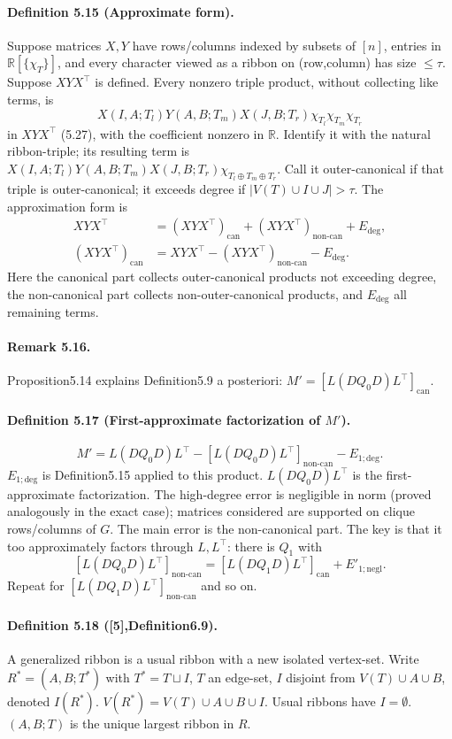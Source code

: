 \documentclass[10pt,a4paper]{article}
\begin{document}
\paragraph{Definition 5.15 (Approximate form).} Suppose matrices $X,Y$ have rows/columns indexed by subsets of $[n]$, entries in $\mathbb R[\{\chi_T\}]$, and every character viewed as a ribbon on (row,column) has size $\le\tau$. Suppose $XYX^\top$ is defined. Every nonzero triple product, without collecting like terms, is
\[X(I,A;T_l)Y(A,B;T_m)X(J,B;T_r)\chi_{T_l}\chi_{T_m}\chi_{T_r}\tag{5.28}\]
in $XYX^\top$ (5.27), with the coefficient nonzero in $\mathbb R$. Identify it with the natural ribbon-triple; its resulting term is $X(I,A;T_l)Y(A,B;T_m)X(J,B;T_r)\chi_{T_l\oplus T_m\oplus T_r}$. Call it outer-canonical if that triple is outer-canonical; it exceeds degree if $|V(T)\cup I\cup J|>\tau$. The approximation form is
\begin{align*}XYX^\top&=(XYX^\top)_{\mathrm{can}}+(XYX^\top)_{\mathrm{non\text{-}can}}+E_{\mathrm{deg}},\\(XYX^\top)_{\mathrm{can}}&=XYX^\top-(XYX^\top)_{\mathrm{non\text{-}can}}-E_{\mathrm{deg}}.\tag{5.29}\end{align*}
Here the canonical part collects outer-canonical products not exceeding degree, the non-canonical part collects non-outer-canonical products, and $E_{\mathrm{deg}}$ all remaining terms.
\paragraph{Remark 5.16.} Proposition5.14 explains Definition5.9 a posteriori: $M'=[L(DQ_0D)L^\top]_{\mathrm{can}}$.
\paragraph{Definition 5.17 (First-approximate factorization of $M'$).}
\[M'=L(DQ_0D)L^\top-[L(DQ_0D)L^\top]_{\mathrm{non\text{-}can}}-E_{1;\mathrm{deg}}.\tag{5.30}\]
$E_{1;\mathrm{deg}}$ is Definition5.15 applied to this product. $L(DQ_0D)L^\top$ is the first-approximate factorization. The high-degree error is negligible in norm (proved analogously in the exact case); matrices considered are supported on clique rows/columns of $G$. The main error is the non-canonical part. The key is that it too approximately factors through $L,L^\top$: there is $Q_1$ with
\[[L(DQ_0D)L^\top]_{\mathrm{non\text{-}can}}=[L(DQ_1D)L^\top]_{\mathrm{can}}+E'_{1;\mathrm{negl}}.\tag{5.31}\]
Repeat for $[L(DQ_1D)L^\top]_{\mathrm{non\text{-}can}}$ and so on.
\paragraph{Definition 5.18 ([5],Definition6.9).} A generalized ribbon is a usual ribbon with a new isolated vertex-set. Write $R^*=(A,B;T^*)$ with $T^*=T\sqcup I$, $T$ an edge-set, $I$ disjoint from $V(T)\cup A\cup B$, denoted $I(R^*)$. $V(R^*)=V(T)\cup A\cup B\cup I$. Usual ribbons have $I=\emptyset$. $(A,B;T)$ is the unique largest ribbon in $R$.
\end{document}
